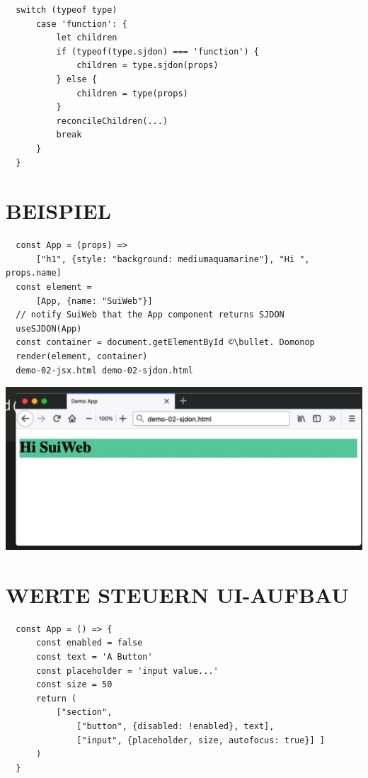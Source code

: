   \begin{verbatim}
  switch (typeof type)
      case 'function': {
          let children
          if (typeof(type.sjdon) === 'function') {
              children = type.sjdon(props)
          } else {
              children = type(props)
          }
          reconcileChildren(...)
          break
      }
  }
  \end{verbatim}
  
  \section*{BEISPIEL}
  \begin{verbatim}
  const App = (props) =>
      ["h1", {style: "background: mediumaquamarine"}, "Hi ", props.name]
  const element =
      [App, {name: "SuiWeb"}]
  // notify SuiWeb that the App component returns SJDON
  useSJDON(App)
  const container = document.getElementById ©\bullet. Domonop
  render(element, container)
  demo-02-jsx.html demo-02-sjdon.html
  \end{verbatim}
  
  \begin{center}
  \includegraphics[width=\linewidth]{images/2025_01_02_254b5e4c52d090c313e1g-25}
  \end{center}
  
  \section*{WERTE STEUERN UI-AUFBAU}
  \begin{verbatim}
  const App = () => {
      const enabled = false
      const text = 'A Button'
      const placeholder = 'input value...'
      const size = 50
      return (
          ["section",
              ["button", {disabled: !enabled}, text],
              ["input", {placeholder, size, autofocus: true}] ]
      )
  }
  \end{verbatim}
  
